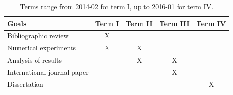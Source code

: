 \documentclass[a4,useAMS,usenatbib,usegraphicx,12pt]{article}
\begin{document}
\begin{table}[h]
\begin{flushleft}
\begin{center}
  \begin{tabular}{l  c c c c } \hline\hline
	\centering\textbf{Goals} & \textbf{Term I} & \textbf{Term II} & 
	\textbf{Term III} & \textbf{Term IV} \\ \hline\hline
	
	 Bibliographic review & X & & & \\
	 Numerical experiments & X & X & & \\
	 Analysis of results &  & X & X & \\
	 International journal paper &  &  & X & \\
	 Dissertation &  &  &  & X \\
	\hline\hline
  \end{tabular}  
  \caption{ Terms range from 2014-02 for term I, up to 2016-01 for term IV.}
\end{center}
\end{flushleft}
\end{table}



\renewcommand{\bibname}{8\ \ \ \ Bibliography}
\small

\end{document}
